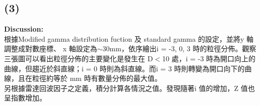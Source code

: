 \documentclass{article}
\begin{document}
\begin{CJK*}{UTF8}{bsmi}
\subsection*{(3)}
    \begin{spacing}{3}
        \begin{large}
            \textbf{Discussion:} \\
                根據\;Modified gamma distribution fuction 及 \;standard gamma 的設定，並將\;y 軸調整成對數座標、
                x 軸設定為$\sim$30\;mm，依序繪出\;i = -3, 0, 3 時的粒徑分佈。觀察三張圖可以看出粒徑分佈的主要變化是發生在
                \;D$<$10 處，i = -3 時為開口向上的曲線，但趨近於斜直線；i = 0 時則為斜直線。而\;i = 3 時則轉變為開口向下的曲
                線，且在粒徑約等於 mm 時有數量分佈的最大值。\\
                另根據雷達回波因子之定義，積分計算各情況之值。發現隨著\;i 值的增加，Z 值也呈指數增加。
        \end{large}
    \end{spacing}




\end{CJK*}
\end{document}
